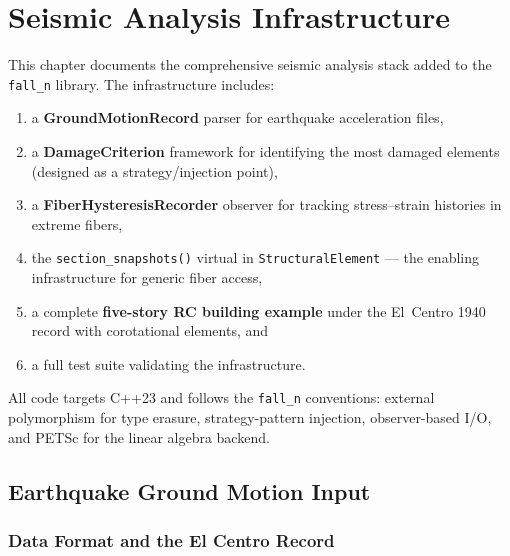 
\chapter{Seismic Analysis Infrastructure}
\label{ch:seismic-analysis-infra}

This chapter documents the comprehensive seismic analysis stack added
to the \texttt{fall\_n} library.  The infrastructure includes:
%
\begin{enumerate}
  \item a \textbf{GroundMotionRecord} parser for earthquake acceleration
        files,
  \item a \textbf{DamageCriterion} framework for identifying the most
        damaged elements (designed as a strategy/injection point),
  \item a \textbf{FiberHysteresisRecorder} observer for tracking
        stress--strain histories in extreme fibers,
  \item the \texttt{section\_snapshots()} virtual in
        \texttt{StructuralElement} --- the enabling infrastructure
        for generic fiber access,
  \item a complete \textbf{five-story RC building example} under the
        El~Centro 1940 record with corotational elements, and
  \item a full test suite validating the infrastructure.
\end{enumerate}

All code targets C++23 and follows the \texttt{fall\_n} conventions:
external polymorphism for type erasure, strategy-pattern injection,
observer-based I/O, and PETSc for the linear algebra backend.


\section{Earthquake Ground Motion Input}
\label{sec:seismic-ground-motion}

\subsection{Data Format and the El Centro Record}

